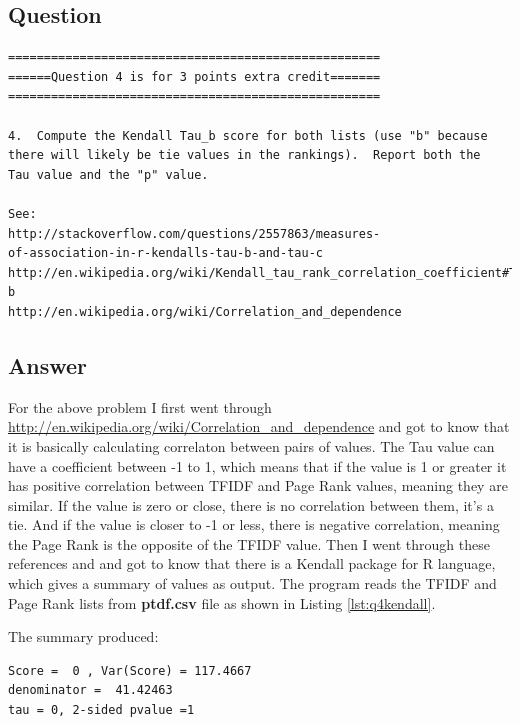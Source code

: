 \documentclass[letterpaper,11pt]{article}
\begin{document}
\subsection*{Question}

\begin{verbatim}
====================================================
======Question 4 is for 3 points extra credit=======
====================================================

4.  Compute the Kendall Tau_b score for both lists (use "b" because
there will likely be tie values in the rankings).  Report both the
Tau value and the "p" value.

See: 
http://stackoverflow.com/questions/2557863/measures-
of-association-in-r-kendalls-tau-b-and-tau-c
http://en.wikipedia.org/wiki/Kendall_tau_rank_correlation_coefficient#Tau-b
http://en.wikipedia.org/wiki/Correlation_and_dependence
\end{verbatim}

\clearpage
\subsection*{Answer}

For the above problem I first went through \url{http://en.wikipedia.org/wiki/Correlation_and_dependence}
and got to know that it is basically calculating correlaton between pairs of values. The Tau value can have a coefficient between -1 to 1, which means that if the value is 1 or greater it has positive correlation between TFIDF and Page Rank values, meaning they are similar. If the value is zero or close, there is no correlation between them, it’s a tie. And if the value is closer to -1 or less, there is negative correlation, meaning the Page Rank is the opposite of the TFIDF value. Then I went through these references \cite{wikipediaref} and \cite{cranref} and got to know that there is a Kendall package for R language, which gives a summary of values as output. The program reads the TFIDF and Page Rank lists from \textbf{ptdf.csv} file as shown in Listing \ref{lst:q4kendall}.




The summary produced:

\begin{verbatim}
Score =  0 , Var(Score) = 117.4667
denominator =  41.42463
tau = 0, 2-sided pvalue =1

\end{verbatim}
\end{document}
